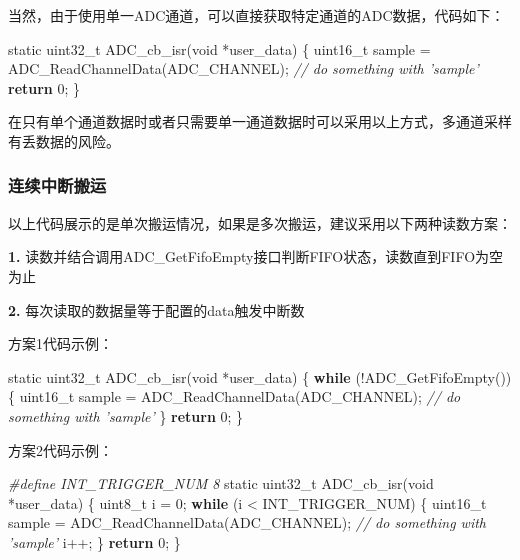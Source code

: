 \documentclass[
  12pt,
]{book}
\newenvironment{Shaded}{\begin{snugshade}}{\end{snugshade}}
\newcommand{\CommentTok}[1]{\textcolor[rgb]{0.56,0.35,0.01}{\textit{#1}}}
\newcommand{\ControlFlowTok}[1]{\textcolor[rgb]{0.13,0.29,0.53}{\textbf{#1}}}
\newcommand{\DataTypeTok}[1]{\textcolor[rgb]{0.13,0.29,0.53}{#1}}
\newcommand{\DecValTok}[1]{\textcolor[rgb]{0.00,0.00,0.81}{#1}}
\newcommand{\NormalTok}[1]{#1}
\newcommand{\PreprocessorTok}[1]{\textcolor[rgb]{0.56,0.35,0.01}{\textit{#1}}}
\begin{document}
当然，由于使用单一ADC通道，可以直接获取特定通道的ADC数据，代码如下：

\begin{Shaded}
\begin{Highlighting}[]
\DataTypeTok{static} \DataTypeTok{uint32_t}\NormalTok{ ADC_cb_isr(}\DataTypeTok{void}\NormalTok{ *user_data)}
\NormalTok{\{}
    \DataTypeTok{uint16_t}\NormalTok{ sample = ADC_ReadChannelData(ADC_CHANNEL);}
    \CommentTok{// do something with 'sample'}
    \ControlFlowTok{return} \DecValTok{0}\NormalTok{;}
\NormalTok{\}}
\end{Highlighting}
\end{Shaded}

在只有单个通道数据时或者只需要单一通道数据时可以采用以上方式，多通道采样有丢数据的风险。

\hypertarget{ux8fdeux7eedux4e2dux65adux642cux8fd0}{%
\subsubsection{连续中断搬运}\label{ux8fdeux7eedux4e2dux65adux642cux8fd0}}

以上代码展示的是单次搬运情况，如果是多次搬运，建议采用以下两种读数方案：

\textbf{1.} 读数并结合调用ADC\_GetFifoEmpty接口判断FIFO状态，读数直到FIFO为空为止

\textbf{2.} 每次读取的数据量等于配置的data触发中断数

方案1代码示例：

\begin{Shaded}
\begin{Highlighting}[]
\DataTypeTok{static} \DataTypeTok{uint32_t}\NormalTok{ ADC_cb_isr(}\DataTypeTok{void}\NormalTok{ *user_data)}
\NormalTok{\{}
    \ControlFlowTok{while}\NormalTok{ (!ADC_GetFifoEmpty()) \{}
        \DataTypeTok{uint16_t}\NormalTok{ sample = ADC_ReadChannelData(ADC_CHANNEL);}
        \CommentTok{// do something with 'sample'}
\NormalTok{    \}}
    \ControlFlowTok{return} \DecValTok{0}\NormalTok{;}
\NormalTok{\}}
\end{Highlighting}
\end{Shaded}

方案2代码示例：

\begin{Shaded}
\begin{Highlighting}[]
\PreprocessorTok{#define INT_TRIGGER_NUM    8}
\DataTypeTok{static} \DataTypeTok{uint32_t}\NormalTok{ ADC_cb_isr(}\DataTypeTok{void}\NormalTok{ *user_data)}
\NormalTok{\{}
    \DataTypeTok{uint8_t}\NormalTok{ i = }\DecValTok{0}\NormalTok{;}
    \ControlFlowTok{while}\NormalTok{ (i < INT_TRIGGER_NUM) \{}
        \DataTypeTok{uint16_t}\NormalTok{ sample = ADC_ReadChannelData(ADC_CHANNEL);}
        \CommentTok{// do something with 'sample'}
\NormalTok{        i++;}
\NormalTok{    \}}
    \ControlFlowTok{return} \DecValTok{0}\NormalTok{;}
\NormalTok{\}}
\end{Highlighting}
\end{Shaded}
\end{document}
